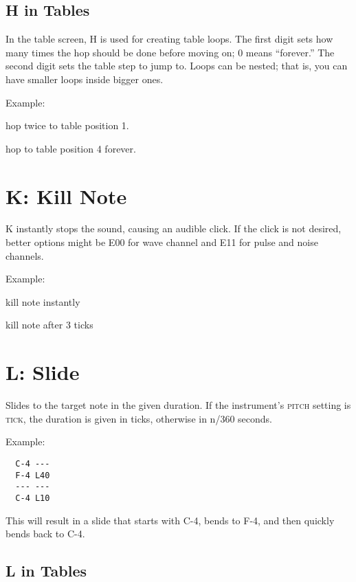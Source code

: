 \subsection{H in Tables}

In the table screen, H is used for creating table loops. The first digit sets how many times the hop should be done before moving on; 0 means ``forever.'' The second digit sets the table step to jump to. Loops can be nested; that is, you can have smaller loops inside bigger ones.

\begin{description}
\item Example:
\item[H21] hop twice to table position 1.
\item[H04] hop to table position 4 forever.
\end{description}

\section{K: Kill Note}

K instantly stops the sound, causing an audible click. If the click is not desired, better options might be E00 for wave channel and E11 for pulse and noise channels.

\begin{description}
\item Example:
\item[K00] kill note instantly
\item[K03] kill note after 3 ticks
\end{description}

\section{L: Slide}

Slides to the target note in the given duration. If the instrument's \textsc{pitch} setting is \textsc{tick}, the duration is given in ticks, otherwise in n/360 seconds.

Example:

\begin{verbatim}
  C-4 ---
  F-4 L40
  --- ---
  C-4 L10
\end{verbatim}

This will result in a slide that starts with C-4, bends to F-4, and then quickly bends back to C-4.

\subsection{L in Tables}

